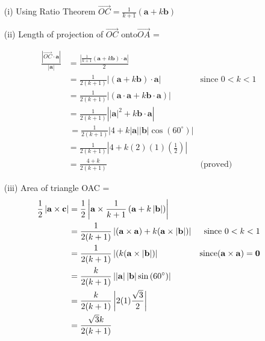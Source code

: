 \item {}
\begin{enumerate}
\item[(i)]  Using Ratio Theorem $\overrightarrow{OC}=\frac{1}{k+1}(\mathbf{a}+k\mathbf{b})$ 
\item[(ii)]  Length of projection of $\overrightarrow{OC}$ onto$\overrightarrow{OA}$
= 

\begin{align*}
\frac{\left|\overrightarrow{OC}\cdot\mathbf{a}\right|}{\left|\mathbf{a}\right|} & =\frac{\left|\frac{1}{k+1}(\mathbf{a}+k\mathbf{b})\cdot\mathbf{a}\right|}{2}\\
 & =\frac{1}{2\left(k+1\right)}\left|(\mathbf{a}+k\mathbf{b})\cdot\mathbf{a}\right| & \text{since }0<k<1\\
 & =\frac{1}{2\left(k+1\right)}\left|(\mathbf{a}\cdot\mathbf{a}+k\mathbf{b}\cdot\mathbf{a})\right|\\
 & =\frac{1}{2\left(k+1\right)}\left|\left|\mathbf{a}\right|^{2}+k\mathbf{b}\cdot\mathbf{a}\right|\\
 & \,=\frac{1}{2\left(k+1\right)}\left|4+k\left|\mathbf{a}\right|\left|\mathbf{b}\right|\cos\left(60^{\circ}\right)\right|\\
 & =\frac{1}{2\left(k+1\right)}\left|4+k\left(2\right)\left(1\right)\left(\frac{1}{2}\right)\right|\\
 & =\frac{4+k}{2\left(k+1\right)} & \text{(proved)}
\end{align*}

\item[(iii)]  Area of triangle OAC =
\begin{align*}
\frac{1}{2}\left|\mathbf{a}\times\text{\ensuremath{\mathbf{c}}}\right| & =\frac{1}{2}\left|\mathbf{a}\times\frac{1}{k+1}\left(\mathbf{a}+k\left|\mathbf{b}\right|\right)\right|\\
 & =\frac{1}{2(k+1)}\left|(\mathbf{a}\times\mathbf{a})+k(\mathbf{a}\times\left|\mathbf{b}\right|)\right| & \text{since }0<k<1\\
 & =\frac{1}{2(k+1)}\left|(k(\mathbf{a}\times\left|\mathbf{b}\right|)\right| & \text{since}(\mathbf{a}\times\mathbf{a})=\mathbf{0}\\
 & =\frac{k}{2(k+1)}\left|\left|\mathbf{a}\right|\left|\mathbf{b}\right|\sin\left(60^{\circ}\right)\right|\\
 & =\frac{k}{2(k+1)}\left|2(1)\frac{\sqrt{3}}{2}\right|\\
 & =\frac{\sqrt{3}k}{2(k+1)}
\end{align*}
\end{enumerate}